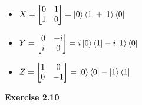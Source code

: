\documentclass{article}
\begin{document}
\begin{framed}
\begin{itemize}
        \item $X = \begin{bmatrix}0 & 1 \\ 1 & 0\end{bmatrix} = \ket{0}\bra{1} + \ket{1}\bra{0}$
        \item $Y=\begin{bmatrix}0 & -i \\ i & 0\end{bmatrix} = i\ket{0}\bra{1} - i\ket{1}\bra{0}$ 
        \item $Z=\begin{bmatrix}1 & 0 \\ 0 & -1\end{bmatrix} = \ket{0}\bra{0} - \ket{1}\bra{1}$
    \end{itemize}
    
\end{framed}

\bigskip

\begin{framed}
    \noindent \textbf{Exercise 2.10}
    
    \medskip
    
    
\end{framed}

\bigskip
\end{document}
